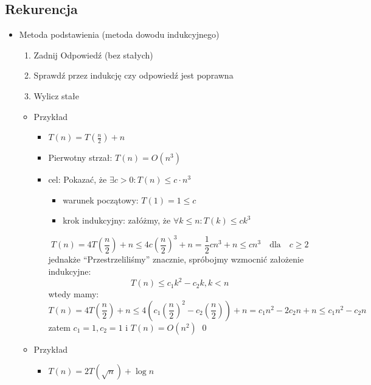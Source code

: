 \documentclass[11pt,a4paper]{article}
\begin{document}
\subsection{Rekurencja}
\begin{itemize}
    \item Metoda podstawienia (metoda dowodu indukcyjnego)
        \begin{enumerate}
        \item Zadnij Odpowiedź (bez stałych)
        \item Sprawdź przez indukcję czy odpowiedź jest poprawna
        \item Wylicz stałe
        \end{enumerate}
        \begin{itemize}
            \item Przykład
                \begin{itemize}
                    \item $T(n) = T(\frac{n}{2}) + n$
                    \item Pierwotny strzał: $T(n) = O(n^3)$
                    \item cel: Pokazać, że $\exists c>0: T(n) \leq c \cdot n^3$
                        \begin{itemize}
                            \item warunek początowy: $T(1) = 1 \leq c$
                            \item krok indukcyjny: załóżmy, że $\forall k \leq n: T(k) \leq ck^3$
                        \end{itemize}
                        \[
                            T(n) = 4T(\frac{n}{2}) + n \leq 4c(\frac{n}{2})^3 + n = \frac{1}{2}cn^3 + n \leq cn^3 \quad \text{dla} \quad c \geq 2
                        \]
                        jednakże ``Przestrzeliliśmy'' znacznie, spróbojmy wzmocnić założenie indukcyjne:
                        \[
                            T(n) \leq c_1k^2 -c_2k, k < n
                        \]
                        wtedy mamy:
                        \[
                            T(n) = 4T(\frac{n}{2}) +n \leq 4(c_1(\frac{n}{2})^2 - c_2(\frac{n}{2})) + n = c_1n^2 - 2c_2n + n \leq c_1n^2 - c_2n
                        \]
                        zatem $c_1 = 1, c_2 = 1$ i $T(n) = O(n^2)$ \qed
                \end{itemize}
            \item Przykład
                \begin{itemize}
                    \item $T(n) = 2T(\sqrt{n}) + \log n$

\end{itemize}
\end{itemize}
\end{itemize}
\end{document}
